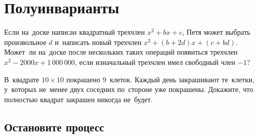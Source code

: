 
\section*{Полуинварианты}


\begin{problems}

\item
Если на~доске написан квадратный трехчлен $x^2 + b x + c$, Петя может выбрать
произвольное $d$ и~написать новый трехчлен $x^2 + (b + 2 d) x + (c + b d)$.
Может~ли на~доске после нескольких таких операций появиться трехчлен
$x^2 - 2000 x + 1\,000\,000$, если изначальный трехчлен имел свободный член
$-1$?

\item
В~квадрате $10 \times 10$ покрашено $9$~клеток.
Каждый день закрашивают те~клетки, у~которых не~менее двух соседних по~стороне
уже покрашены.
Докажите, что полностью квадрат закрашен никогда не~будет.

\end{problems}

\subsection*{Остановите процесс}

